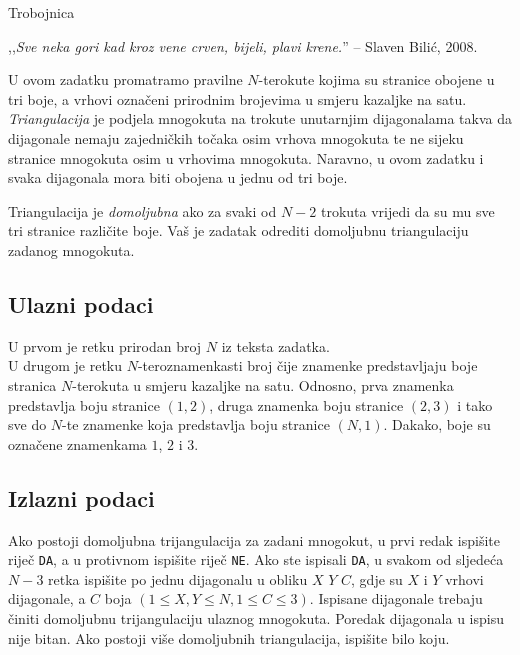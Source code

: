 \begin{statement}[
  problempoints=110,
  timelimit=2 sekunde,
  memorylimit=512 MiB,
]{Trobojnica}


,,\textit{Sve neka gori kad kroz vene crven, bijeli, plavi krene.}''
-- Slaven Bilić, 2008.

U ovom zadatku promatramo pravilne $N$-terokute kojima su stranice obojene u tri
boje, a vrhovi označeni prirodnim brojevima u smjeru kazaljke na satu.
\textit{Triangulacija} je podjela mnogokuta na trokute unutarnjim
dijagonalama takva da dijagonale nemaju zajedničkih točaka osim vrhova mnogokuta
te ne sijeku stranice mnogokuta osim u vrhovima mnogokuta. Naravno, u ovom
zadatku i svaka dijagonala mora biti obojena u jednu od tri boje.

Triangulacija je \textit{domoljubna} ako za svaki od $N-2$ trokuta vrijedi da su
mu sve tri stranice različite boje. Vaš je zadatak odrediti domoljubnu
triangulaciju zadanog mnogokuta.

\subsection*{Ulazni podaci}
U prvom je retku prirodan broj $N$ iz teksta zadatka. \\
U drugom je retku $N$-teroznamenkasti broj čije znamenke predstavljaju boje
stranica $N$-terokuta u smjeru kazaljke na satu. Odnosno, prva znamenka
predstavlja boju stranice $(1,2)$, druga znamenka boju stranice $(2,3)$ i tako
sve do $N$-te znamenke koja predstavlja boju stranice $(N, 1)$. Dakako, boje su
označene znamenkama $1$, $2$ i $3$.

\subsection*{Izlazni podaci}
Ako postoji domoljubna trijangulacija za zadani mnogokut, u prvi redak ispišite
riječ \texttt{DA}, a u protivnom ispišite riječ \texttt{NE}. Ako ste ispisali
\texttt{DA}, u svakom od sljedeća $N-3$ retka ispišite po jednu
dijagonalu u obliku $X$ $Y$ $C$, gdje su $X$ i $Y$ vrhovi dijagonale, a $C$ boja
$(1 \le X, Y \le N, 1 \le C \le 3)$. Ispisane dijagonale trebaju činiti
domoljubnu trijangulaciju ulaznog mnogokuta. Poredak dijagonala u ispisu nije
bitan. Ako postoji više domoljubnih triangulacija, ispišite bilo koju.


\end{statement}
